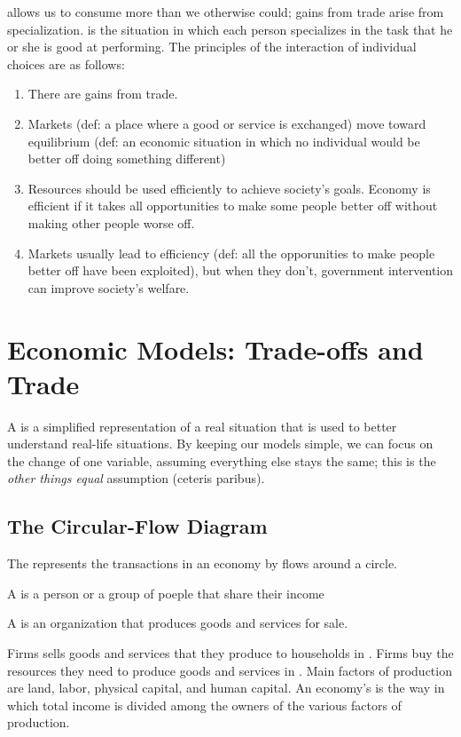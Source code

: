 \documentclass{article}
\begin{document}
 allows us to consume more than we otherwise could; gains from trade arise from specialization.  is the situation in which each person specializes in the task that he or she is good at performing. The principles of the interaction of individual choices are as follows: 
\begin{enumerate}
  \item There are gains from trade. 
  \item Markets (def: a place where a good or service is exchanged) move toward equilibrium (def: an economic situation in which no individual would be better off doing something different)
  \item Resources should be used efficiently to achieve society's goals. Economy is efficient if it takes all opportunities to make some people better off without making other people worse off. 
  \item Markets usually lead to efficiency (def: all the opporunities to make people better off have been exploited), but when they don't, government intervention can improve society's welfare.
\end{enumerate}

\section{Economic Models: Trade-offs and Trade}

A  is a simplified representation of a real situation that is used to better understand real-life situations. By keeping our models simple, we can focus on the change of one variable, assuming everything else stays the same; this is the \emph{other things equal} assumption (ceteris paribus). 

\subsection{The Circular-Flow Diagram}

The  represents the transactions in an economy by flows around a circle. 
\begin{definition}
  A  is a person or a group of poeple that share their income 
\end{definition}
\begin{definition}
  A  is an organization that produces goods and services for sale. 
\end{definition}
Firms sells goods and services that they produce to households in . Firms buy the resources they need to produce goods and services in . Main factors of production are land, labor, physical capital, and human capital. An economy's  is the way in which total income is divided among the owners of the various factors of production. 
\end{document}

